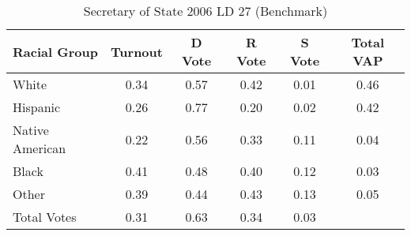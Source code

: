 \begin{table}[htb]
\begin{center}
\caption{Secretary of State 2006 LD 27 (Benchmark)}
\label{sos06_vap_ld_27_benchmark}
\begin{tabular}{lccccc}
  \hline
Racial Group & Turnout & D Vote & R Vote & S Vote & Total VAP \\ 
  \hline
White & 0.34 & 0.57 & 0.42 & 0.01 & 0.46 \\ 
  Hispanic & 0.26 & 0.77 & 0.20 & 0.02 & 0.42 \\ 
  Native American & 0.22 & 0.56 & 0.33 & 0.11 & 0.04 \\ 
  Black & 0.41 & 0.48 & 0.40 & 0.12 & 0.03 \\ 
  Other & 0.39 & 0.44 & 0.43 & 0.13 & 0.05 \\ 
  Total Votes & 0.31 & 0.63 & 0.34 & 0.03 &  \\ 
   \hline
\end{tabular}
\end{center}
\end{table}
